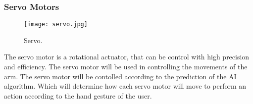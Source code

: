 \documentclass[12pt]{article}
\begin{document}
            \subsubsection{Servo Motors}
    \begin{flushleft}
        \begin{figure}[h!]
            \centering
            \texttt{[image: servo.jpg]}
            \caption{Servo.}
        \end{figure}
        The servo motor is a rotational actuator, that can be control with high precision and efficiency.
        The servo motor will be used in controlling the movements of the arm. The servo motor will be contolled according to the prediction
        of the AI algorithm. Which will determine how each servo motor will move to perform an action according to the hand gesture of the user.
    \end{flushleft}
\end{document}
